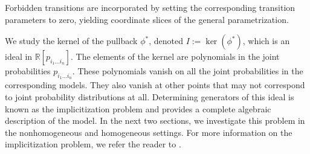 \documentclass[11pt, a4paper]{article}
\numberwithin{equation}{section}
\theoremstyle{plain}
\theoremstyle{definition}
\begin{document}
Forbidden transitions are incorporated by setting the corresponding transition parameters to zero, yielding coordinate slices of the general parametrization.
 
 

We study the kernel of the pullback $\phi^*$, denoted $I:=\ker(\phi^*)$, which is an ideal in
$\mathbb{R}[p_{i_1\ldots i_n}]$. The elements of the kernel are polynomials in the joint probabilities $p_{i_1\ldots i_n}$. These polynomials vanish on all the joint probabilities in the corresponding models.  They also vanish at other points that may not correspond to joint probability distributions at all. Determining generators of this ideal is known as the implicitization
problem and provides a complete algebraic description of the model. In the next two sections, we
investigate this problem in the nonhomogeneous and homogeneous settings. For more information on the implicitization problem, we refer the reader to \cite[Chapter 3 
\S3]{cox2007ideals}.
\end{document}
